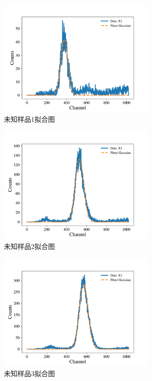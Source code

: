 \documentclass{article}
\begin{document}
    \begin{figure}[htbp]
        \centering
        \includegraphics[width=0.7\textwidth]{../plot/Fitted_X1.pdf}
        \caption{未知样品1拟合图\label{fig:Fitted_X1}}
    \end{figure}
    \begin{figure}[htbp]
        \centering
        \includegraphics[width=0.7\textwidth]{../plot/Fitted_X2.pdf}
        \caption{未知样品2拟合图\label{fig:Fitted_X2}}
    \end{figure}
    \begin{figure}[htbp]
        \centering
        \includegraphics[width=0.7\textwidth]{../plot/Fitted_X3.pdf}
        \caption{未知样品3拟合图\label{fig:Fitted_X3}}
    \end{figure}
\end{document}
